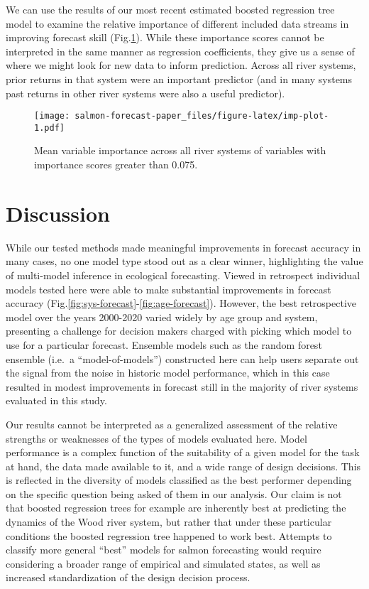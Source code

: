 \documentclass[
]{article}
\begin{document}
We can use the results of our most recent estimated boosted regression tree model to examine the relative importance of different included data streams in improving forecast skill (Fig.\ref{fig:imp-plot}). While these importance scores cannot be interpreted in the same manner as regression coefficients, they give us a sense of where we might look for new data to inform prediction. Across all river systems, prior returns in that system were an important predictor (and in many systems past returns in other river systems were also a useful predictor).

\begin{figure}
\centering
\texttt{[image: salmon-forecast-paper\_files/figure-latex/imp-plot-1.pdf]}
\caption{\label{fig:imp-plot}Mean variable importance across all river systems of variables with importance scores greater than 0.075.}
\end{figure}

\hypertarget{discussion}{%
\section{Discussion}\label{discussion}}

While our tested methods made meaningful improvements in forecast accuracy in many cases, no one model type stood out as a clear winner, highlighting the value of multi-model inference in ecological forecasting. Viewed in retrospect individual models tested here were able to make substantial improvements in forecast accuracy (Fig.\ref{fig:sys-forecast}-\ref{fig:age-forecast}). However, the best retrospective model over the years 2000-2020 varied widely by age group and system, presenting a challenge for decision makers charged with picking which model to use for a particular forecast. Ensemble models such as the random forest ensemble (i.e.~a ``model-of-models'') constructed here can help users separate out the signal from the noise in historic model performance, which in this case resulted in modest improvements in forecast still in the majority of river systems evaluated in this study.

Our results cannot be interpreted as a generalized assessment of the relative strengths or weaknesses of the types of models evaluated here. Model performance is a complex function of the suitability of a given model for the task at hand, the data made available to it, and a wide range of design decisions. This is reflected in the diversity of models classified as the best performer depending on the specific question being asked of them in our analysis. Our claim is not that boosted regression trees for example are inherently best at predicting the dynamics of the Wood river system, but rather that under these particular conditions the boosted regression tree happened to work best. Attempts to classify more general ``best'' models for salmon forecasting would require considering a broader range of empirical and simulated states, as well as increased standardization of the design decision process.
\end{document}
